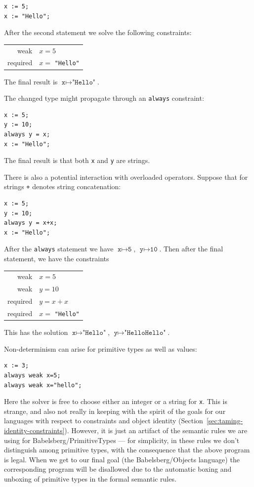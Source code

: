 \documentclass{article}
\begin{document}
\begin{verbatim}
x := 5;
x := "Hello";
\end{verbatim}

After the second statement we solve the following constraints:

\begin{tabular}{rl}
weak     & $x = 5$ \\
required & $x = $ \verb|"Hello"|
\end{tabular}

The final result is $\texttt{x} \mapsto \texttt{"Hello"}$.

The changed type might propagate through an \verb|always| constraint:

\begin{verbatim}
x := 5;
y := 10;
always y = x;
x := "Hello";
\end{verbatim}

The final result is that both \verb|x| and \verb|y| are strings.

There is also a potential interaction with overloaded operators.
Suppose that for strings \verb|+| denotes string concatenation:

\begin{verbatim}
x := 5;
y := 10;
always y = x+x;
x := "Hello";
\end{verbatim}

After the \verb|always| statement we have 
$\texttt{x} \mapsto \texttt{5}$, $\texttt{y} \mapsto \texttt{10}$.
Then after the final statement, we have the constraints

\begin{tabular}{rl}
weak     & $x=5$ \\
weak     & $y=10$ \\
required & $y=x+x$ \\
required & $x=$ \texttt{"Hello"}
\end{tabular}

This has the solution $\texttt{x} \mapsto \texttt{"Hello"}$, 
$\texttt{y} \mapsto \texttt{"HelloHello"}$.

Non-determinism can arise for primitive types as well as values:

\begin{verbatim}
x := 3;
always weak x=5;
always weak x="hello";
\end{verbatim}

Here the solver is free to choose either an integer or a string for
\verb|x|.  This is strange, and also not really in keeping with the
spirit of the goals for our languages with respect to constraints and
object identity (Section~\ref{sec:taming-identity-constraints}).
However, it is just an artifact of the semantic rules we are using for
Babelsberg/PrimitiveTypes --- for simplicity, in these rules we don't
distinguish among primitive types, with the consequence that the above
program is legal.  When we get to our final goal (the
Babelsberg/Objects language) the corresponding program will be
disallowed due to the automatic boxing and unboxing of primitive types
in the formal semantic rules.
\end{document}

